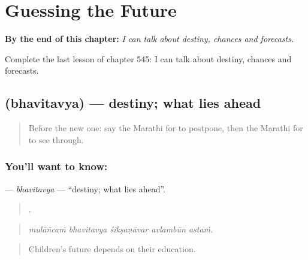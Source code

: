 
\chapter{Guessing the Future}
\label{ch:mr-guessing-the-future}

\begin{chapteropening}
\textbf{By the end of this chapter:} \emph{I can talk about destiny, chances and forecasts.}

Complete the last lesson of chapter 545: I can talk about destiny, chances and forecasts.
\end{chapteropening}

\section[\texorpdfstring{\mr{भवितव्य} (bhavitavya)}{भवितव्य (bhavitavya)}]{ (bhavitavya) — destiny; what lies ahead}

\label{lesson:MR-C545-bhavitavya}



\begin{quote}
Before the new one: say the Marathi for to postpone, then the Marathi for to see through.
\end{quote}

\subsection*{You'll want to know: }
\textbf{} — \emph{bhavitavya} — \textquotedblleft{}destiny; what lies ahead\textquotedblright{}.

\begin{quote}
    .
\end{quote}

\begin{quote}
\emph{mulāñcaṁ bhavitavya śikṣaṇāvar avlambūn astaṁ.}
\end{quote}

\begin{quote}
Children's future depends on their education.
\end{quote}

